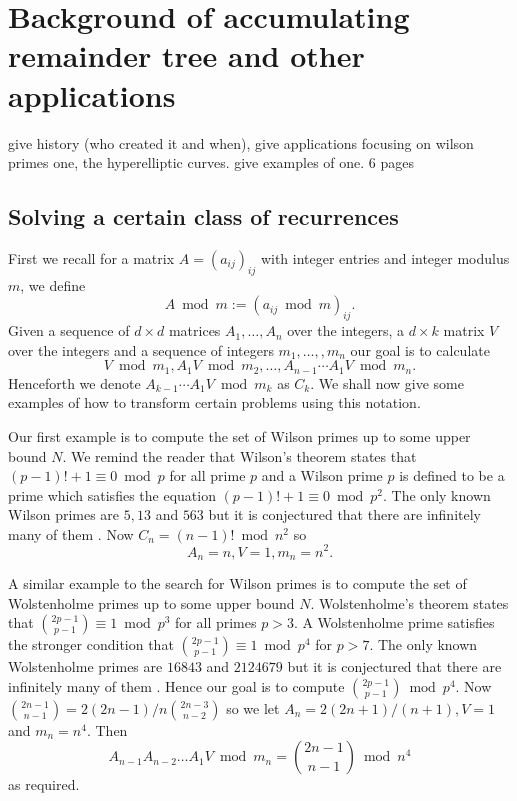 \section{Background of accumulating remainder tree and other applications}

give history (who created it and when), give applications focusing on wilson primes one, the hyperelliptic curves. give examples of one. 6 pages

\subsection{Solving a certain class of recurrences}

First we recall for a matrix $A=(a_{ij})_{ij}$ with integer entries and integer modulus $m$, we define \[A\bmod m:=(a_{ij}\bmod m)_{ij}.\]  
Given a sequence of $d\times d$ matrices $A_1,\dots, A_n$ over the integers, a $d\times k $ matrix $V$ over the integers and a sequence of integers $m_1,\dots,, m_n$ our goal is to calculate \[V\bmod m_1, A_1 V\bmod m_2, \dots, A_{n-1}\cdots A_1 V \bmod m_n.\] Henceforth we denote 
$A_{k-1}\cdots A_1 V\bmod m_k$ as $C_k$. We shall now give some examples of how to transform certain problems using this notation.

Our first example is to compute the set of Wilson primes up to some upper bound $N$. We remind the reader that Wilson's theorem states that $(p-1)!+1\equiv 0\bmod p$ for all prime $p$ and a Wilson prime $p$ is defined to be a prime which satisfies the equation $(p-1)!+1\equiv 0 \bmod p^2$. The only known Wilson primes are $5,13$ and $563$ \cite{CGH14} but it is conjectured that there are infinitely many of them \cite{CGH14}. Now $C_n=(n-1)!\bmod n^2$ so \[A_{n}=n, V=1, m_n=n^2.\]

A similar example to the search for Wilson primes is to compute the set of Wolstenholme primes up to some upper bound $N$. Wolstenholme's theorem states that $\binom{2p-1}{p-1}\equiv 1 \bmod p^3$ for all primes $p>3$\cite{Wol62}. A Wolstenholme prime satisfies the stronger condition that $\binom{2p-1}{p-1}\equiv 1 \bmod p^4$ for $p>7$. The only known Wolstenholme primes are $16843$ and $2124679$  but it is conjectured that there are infinitely many of them . Hence our goal is to compute $\binom{2p-1}{p-1}\bmod p^4$. Now $\binom{2n-1}{n-1}=2(2n-1)/n \binom{2n-3}{n-2}$ so we let $A_n=2(2n+1)/(n+1),V=1$ and $m_n=n^4$. Then \[A_{n-1}A_{n-2}\dots A_1 V\bmod m_n=\binom{2n-1}{n-1}\bmod n^4\] as required. 

